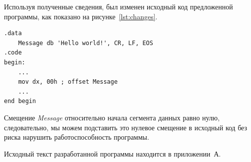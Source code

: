 Используя полученные сведения, был изменен исходный код предложенной программы,
как показано на рисунке~\ref{lst:changes}.

\begin{lstlisting}[caption=Модификация исходного кода,label=lst:changes]
.data
    Message db 'Hello world!', CR, LF, EOS
.code
begin:
    ...
    mov dx, 00h ; offset Message
    ...
end begin
\end{lstlisting}

Смещение \textit{Message} относительно начала сегмента данных равно нулю,
следовательно, мы можем подставить это нулевое смещение в исходный код
без риска нарушить работоспособность программы.

Исходный текст разработанной программы находится в приложении~А.
